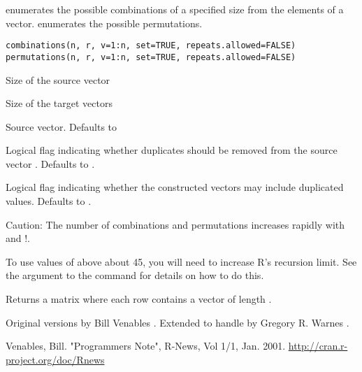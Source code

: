 \begin{Description}\relax
{} enumerates the possible combinations of a
specified size from the elements of a vector.  
enumerates the possible permutations.
\end{Description}
\begin{Usage}
\begin{verbatim}
combinations(n, r, v=1:n, set=TRUE, repeats.allowed=FALSE)
permutations(n, r, v=1:n, set=TRUE, repeats.allowed=FALSE)
\end{verbatim}
\end{Usage}
\begin{Arguments}
\begin{ldescription}
\item[\code{n}] Size of the source vector 
\item[\code{r}] Size of the target vectors 
\item[\code{v}] Source vector. Defaults to 
\item[\code{set}] Logical flag indicating whether duplicates should be
removed from the source vector . Defaults to .
\item[\code{repeats.allowed}] Logical flag indicating whether the
constructed vectors may include duplicated values.  Defaults to
.  
\end{ldescription}
\end{Arguments}
\begin{Details}\relax
Caution: The number of combinations and permutations increases rapidly
with  and !.

To use values of  above about 45, you will need to increase
R's recursion limit.  See the  argument to the
 command for details on how to do this.
\end{Details}
\begin{Value}
Returns a matrix where each row contains a vector of length .
\end{Value}
\begin{Author}\relax
Original versions by Bill Venables
.  Extended to handle
 by Gregory R. Warnes
.
\end{Author}
\begin{References}\relax
Venables, Bill.  "Programmers Note", R-News, Vol 1/1,
Jan. 2001. \url{http://cran.r-project.org/doc/Rnews}
\end{References}
